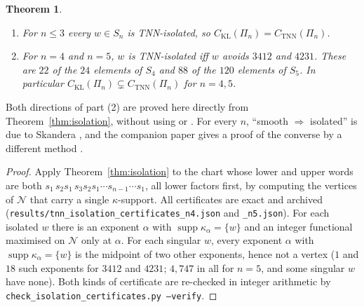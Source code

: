 \documentclass[11pt]{amsart}
\newtheorem{theorem}{Theorem}[section]
\theoremstyle{definition}
\theoremstyle{remark}
\newcommand{\CKL}{C_{\mathrm{KL}}}
\newcommand{\CTNN}{C_{\mathrm{TNN}}}
\newcommand{\supp}{\operatorname{supp}}
\begin{document}
\begin{theorem}\label{thm:smalln}
\begin{enumerate}
\item For $n\le3$ every $w\in S_n$ is TNN-isolated, so $\CKL(\Pi_n)=\CTNN(\Pi_n)$.
\item For $n=4$ and $n=5$, $w$ is TNN-isolated iff $w$ avoids $3412$ and $4231$. These are $22$ of the $24$ elements of $S_4$ and $88$ of the $120$ elements of $S_5$. In particular $\CKL(\Pi_n)\subsetneq\CTNN(\Pi_n)$ for $n=4,5$.
\end{enumerate}
\end{theorem}

Both directions of part (2) are proved here directly from Theorem~\ref{thm:isolation}, without using \cite{Ska08} or \cite{McN}. For every $n$, ``smooth $\Rightarrow$ isolated'' is due to Skandera \cite{Ska08}, and the companion paper gives a proof of the converse by a different method \cite[Thm.~9.6]{McN}.

\begin{proof}
Apply Theorem~\ref{thm:isolation} to the chart whose lower and upper words are both $s_1\,s_2s_1\,s_3s_2s_1\allowbreak\cdots\allowbreak s_{n-1}\cdots s_1$, all lower factors first, by computing the vertices of $\mathcal N$ that carry a single $\kappa$-support. All certificates are exact and archived (\nolinkurl{results/tnn_isolation_certificates_n4.json} and \nolinkurl{_n5.json}). For each isolated $w$ there is an exponent $\alpha$ with $\supp\kappa_\alpha=\{w\}$ and an integer functional maximised on $\mathcal N$ only at $\alpha$. For each singular $w$, every exponent $\alpha$ with $\supp\kappa_\alpha=\{w\}$ is the midpoint of two other exponents, hence not a vertex ($1$ and $18$ such exponents for $3412$ and $4231$; $4{,}747$ in all for $n=5$, and some singular $w$ have none). Both kinds of certificate are re-checked in integer arithmetic by \texttt{check\_isolation\_certificates.py --verify}.
\end{proof}
\end{document}
